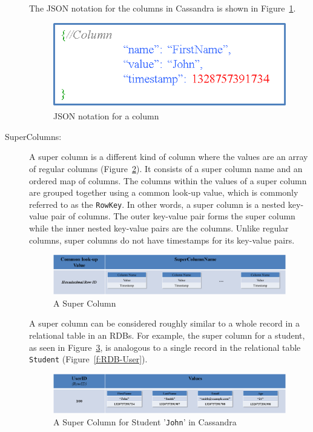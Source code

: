 \begin{description}
The JSON notation for the columns in Cassandra is shown in Figure~\ref{f:column-JSON}. 

\begin{figure}[H]
	\centering
	\includegraphics[width=.4\textwidth]{./figure/Example/Column_JSON.png}
	\caption{JSON notation for a column}\label{f:column-JSON}
\end{figure}
% 

\item [SuperColumns:] A super column is a different kind of column where the
values are an array of regular columns (Figure~\ref{f:supercolumn}).  It consists of a super
column name and an ordered map of columns.  The columns within the values of a
super column are grouped together using a common look-up value,   which is
commonly referred to as the \texttt{RowKey}.  In other words,   a super column is a
nested key-value pair of columns.  The outer key-value pair forms the super column while the inner
nested key-value pairs are the columns.  Unlike regular columns,   super columns do
not have timestamps for its key-value pairs.  

\begin{figure}[H]
	\centering
	\includegraphics[width=.8\textwidth]{./figure/Example/SuperColumn.png}
	\caption{A Super Column }\label{f:supercolumn}
\end{figure}

A super column can be considered roughly similar to a whole record in a
relational table in an \acp{RDB}. For example,   the super column for a
student,   as seen in Figure~\ref{f:supercolumn-John},   is analogous to a single
record in the relational table \texttt{Student} (Figure~\ref{f:RDB-User}). 

\begin{figure}[H]
	\centering
	\includegraphics[width=.8\textwidth]{./figure/Example/SuperColumn_John.png}
	\caption{A Super Column for Student '\texttt{John}' in
	Cassandra}\label{f:supercolumn-John}
\end{figure}


\end{description}
